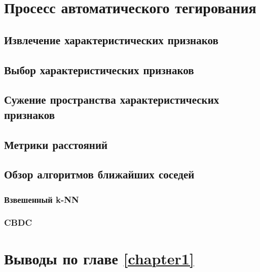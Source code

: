 \section{Просесс автоматического тегирования}

\subsection{Извлечение характеристических признаков}
\subsection{Выбор характеристических признаков}
\subsection{Сужение пространства характеристических признаков}
\subsection{Метрики расстояний}
\subsection{Обзор алгоритмов ближайших соседей}
\subsubsection{Взвешенный k-NN}
\subsubsection{CBDC}
\section{Выводы по главе \ref{chapter1}}





